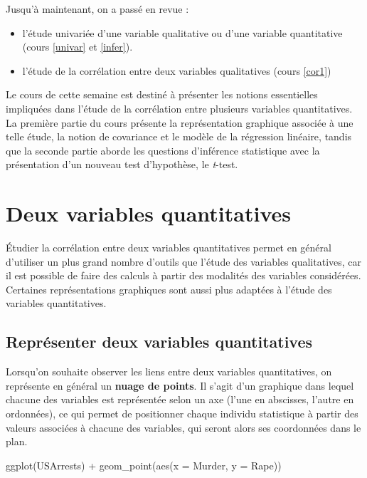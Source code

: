 \documentclass[
  french,
]{book}
\newenvironment{Shaded}{\begin{snugshade}}{\end{snugshade}}
\newcommand{\AttributeTok}[1]{\textcolor[rgb]{0.77,0.63,0.00}{#1}}
\newcommand{\FunctionTok}[1]{\textcolor[rgb]{0.00,0.00,0.00}{#1}}
\newcommand{\NormalTok}[1]{#1}
\newcommand{\SpecialCharTok}[1]{\textcolor[rgb]{0.00,0.00,0.00}{#1}}
\providecommand{\tightlist}{%
  \setlength{\itemsep}{0pt}\setlength{\parskip}{0pt}}
\begin{document}
Jusqu'à maintenant, on a passé en revue :

\begin{itemize}
\tightlist
\item
  l'étude univariée d'une variable qualitative ou d'une variable quantitative (cours \ref{univar} et \ref{infer}).
\item
  l'étude de la corrélation entre deux variables qualitatives (cours \ref{cor1})
\end{itemize}

Le cours de cette semaine est destiné à présenter les notions
essentielles impliquées dans l'étude de la corrélation entre plusieurs
variables quantitatives. La première partie du cours présente la
représentation graphique associée à une telle étude, la notion de
covariance et le modèle de la régression linéaire, tandis que la seconde
partie aborde les questions d'inférence statistique avec la présentation
d'un nouveau test d'hypothèse, le \emph{t}-test.

\hypertarget{deux-variables-quantitatives}{%
\section{Deux variables quantitatives}\label{deux-variables-quantitatives}}

Étudier la corrélation entre deux variables quantitatives permet en
général d'utiliser un plus grand nombre d'outils que l'étude des
variables qualitatives, car il est possible de faire des calculs à
partir des modalités des variables considérées. Certaines
représentations graphiques sont aussi plus adaptées à l'étude des
variables quantitatives.

\hypertarget{repruxe9senter-deux-variables-quantitatives}{%
\subsection{Représenter deux variables quantitatives}\label{repruxe9senter-deux-variables-quantitatives}}

Lorsqu'on souhaite observer les liens entre deux variables
quantitatives, on représente en général un \textbf{nuage de points}. Il
s'agit d'un graphique dans lequel chacune des variables est représentée
selon un axe (l'une en abscisses, l'autre en ordonnées), ce qui permet de
positionner chaque individu statistique à partir des valeurs associées à
chacune des variables, qui seront alors ses coordonnées dans le plan.

\begin{Shaded}
\begin{Highlighting}[]
\FunctionTok{ggplot}\NormalTok{(USArrests) }\SpecialCharTok{+} \FunctionTok{geom\_point}\NormalTok{(}\FunctionTok{aes}\NormalTok{(}\AttributeTok{x =}\NormalTok{ Murder, }\AttributeTok{y =}\NormalTok{ Rape))}
\end{Highlighting}
\end{Shaded}
\end{document}
